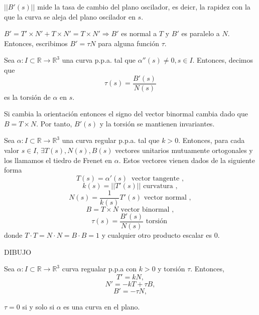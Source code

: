 \begin{obs}
  $||B'(s)||$ mide la tasa de cambio del plano oscilador, es deicr, la rapidez con la que la curva se aleja del plano oscilador en $s$.
\end{obs}

\begin{note}
  $B' = T' \times N' + T \times N' = T \times N' \Rightarrow B'$ es normal a $T$ y $B'$ es paralelo a $N$. Entonces, escribimos $B' = \tau N$ para alguna función $\tau$.
\end{note}

\begin{defn}[Torsión]
  Sea $\alpha  : I \subset \mathbb{R} \to \mathbb{R}^{3}$ una curva p.p.a. tal que $\alpha''(s) \neq 0, s \in I$. Entonces, decimos que
  \[
    \tau(s) = \frac{B'(s)}{N(s)}
  \]
  es la torsión de $\alpha$ en $s$.
\end{defn}

\begin{obs}
  Si cambia la orientación entonces el signo del vector binormal cambia dado que $B = T \times N$. Por tanto, $B'(s)$ y la torsión se mantienen invariantes. 
\end{obs}

\begin{defn}
  Sea $\alpha  : I \subset \mathbb{R} \to \mathbb{R}^{3}$ una curva regular p.p.a. tal que $k>0$. Entonces, para cada valor $s \in I$, $\exists T(s), N(s), B(s)$ vectores unitarios mutuamente ortogonales y los llamamos el tiedro de Frenet en $\alpha$. Estos vectores vienen dados de la siguiente forma
  \[ 
    T(s) = \alpha'(s) \ \text{ vector tangente } ,
  \] 
  \[ 
    k(s) = ||T'(s)||  \text{ curvatura } ,
  \] 
  \[ 
    N(s) = \frac{1}{k(s)}T'(s)  \text{ vector normal } ,
  \]
  \[ 
    B = T \times N  \text{ vector binormal } ,
  \] 
  \[ 
    \tau(s) = \frac{B'(s)}{N(s)}  \text{ torsión } 
  \] 
  donde $T \cdot T = N \cdot N = B \cdot B = 1$ y cualquier otro producto escalar es $0$.
\end{defn}

DIBUJO

\begin{defn}
  Sea $\alpha  : I \subset \mathbb{R} \to \mathbb{R}^{3}$ curva regualar p.p.a con $k>0$ y torsión $\tau$. Entonces, 
  \[ 
    T' = kN, 
  \] 
  \[ 
    N' = -kT + \tau B,
  \] 
  \[ 
    B' = -\tau N,
  \] 
\end{defn}

\begin{prop}
  $\tau = 0$ si y solo si $\alpha$ es una curva en el plano.
\end{prop}

